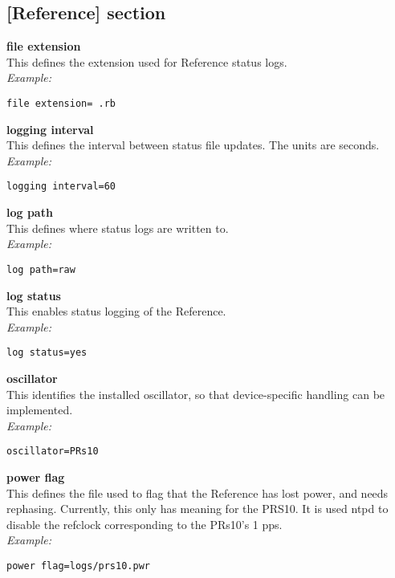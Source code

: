 \subsection{[Reference] section}

\hypertarget{h:reference}{}

{\bfseries file extension}\\
This defines the extension used for Reference status logs.\\
\textit{Example:}
\begin{lstlisting}
file extension= .rb
\end{lstlisting}

{\bfseries logging interval}\\
This defines the interval between status file updates. The units are seconds.\\
\textit{Example:}
\begin{lstlisting}
logging interval=60
\end{lstlisting}

{\bfseries log path}\\
This defines where status logs are written to.\\
\textit{Example:}
\begin{lstlisting}
log path=raw
\end{lstlisting}

{\bfseries log status}\\
This enables status logging of the Reference.\\
\textit{Example:}
\begin{lstlisting}
log status=yes
\end{lstlisting}

{\bfseries oscillator}\\
This identifies the installed oscillator, so that device-specific handling can be implemented.\\
\textit{Example:}
\begin{lstlisting}
oscillator=PRs10
\end{lstlisting}

{\bfseries power flag}\\
This defines the file used to flag that the Reference has lost power, and needs rephasing.
Currently, this only has meaning for the PRS10. It is used ntpd to disable the refclock
corresponding to the PRs10's 1 pps.\\
\textit{Example:}
\begin{lstlisting}
power flag=logs/prs10.pwr
\end{lstlisting}

